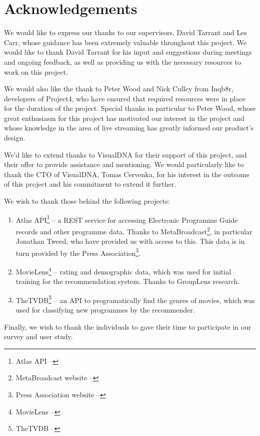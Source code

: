\section{Acknowledgements}

We would like to express our thanks to our supervisors, David Tarrant and Les Carr, whose guidance has been extremely valuable throughout this project. We would like to thank David Tarrant for his input and suggestions during meetings and ongoing feedback, as well as providing us with the necessary resources to work on this project.

We would also like the thank to Peter Wood and Nick Culley from Inqb8r, developers of Project4, who have ensured that required resources were in place for the duration of the project. Special thanks in particular to Peter Wood, whose great enthusiasm for this project has motivated our interest in the project and whose knowledge in the area of live streaming has greatly informed our product's design.

We'd like to extend thanks to VisualDNA for their support of this project, and their offer to provide assistance and mentioning. We would particularly like to thank the CTO of VisualDNA, Tomas Cervenka, for his interest in the outcome of this project and his commitment to extend it further.

We wish to thank those behind the following projects:
\begin{enumerate}
\item Atlas API\footnote{Atlas API -- } -- a REST service for accessing Electronic Programme Guide records and other programme data. Thanks to MetaBroadcast\footnote{MetaBroadcast website -- }, in particular Jonathan Tweed, who have provided us with access to this. This data is in turn provided by the Press Association\footnote{Press Association website -- }.
\item MovieLens\footnote{MovieLens -- } -- rating and demographic data, which was used for initial training for the recommendation system. Thanks to GroupLens research.
\item TheTVDB\footnote{TheTVDB -- } -- an API to programatically find the genres of movies, which was used for classifying new programmes by the recommender.
\end{enumerate}

Finally, we wish to thank the individuals to gave their time to participate in our survey and user study.

\cleardoublepage
\setcounter{tocdepth}{2}

\begin{comment}
	\tableofcontents
	\newpage
	\cleardoublepage
	\setcounter{page}{0}
	\pagenumbering{arabic}
	\cleardoublepage
\end{comment}

